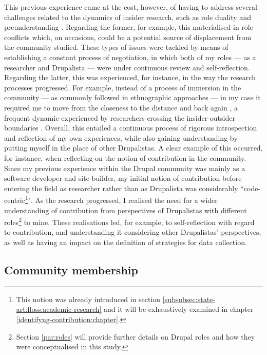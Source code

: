 This previous experience came at the cost, however, of having to address several challenges related to the dynamics of insider research, such as role duality and preunderstanding \parencite[67-71]{brannick2007defense}. Regarding the former, for example, this materialised in role conflicts which, on occasions, could be a potential source of displacement from the community studied. These types of issues were tackled by means of establishing a constant process of negotiation, in which both of my roles --- as a researcher and Drupalista --- were under continuous review and self-reflection. Regarding the latter, this was experienced, for instance, in the way the research processes progressed. For example, instead of a process of immersion in the community --- as commonly followed in ethnographic approaches ---  in my case it required me to move from the closeness to the distance and back again \parencite{nielsen1993nearness}, a frequent dynamic experienced by researchers crossing the insider-outsider boundaries \parencite{kanuha2000being}. Overall, this entailed a continuous process of rigorous introspection and reflection of my own experiences, while also gaining understanding by putting myself in the place of other Drupalistas. A clear example of this occurred, for instance, when reflecting on the notion of contribution in the community. Since my previous experience within the Drupal community was mainly as a software developer and site builder, my initial notion of contribution before entering the field as researcher rather than as Drupalista was considerably ``code-centric\footnote{This notion was already introduced in section \ref{subsubsec:state-art:floss:academic-research} and it will be exhaustively examined in chapter \ref{identifyng-contribution:chapter}.}". As the research progressed, I realised the need for a wider understanding of contribution from perspectives of Drupalistas with different roles\footnote{Section \ref{par:roles} will provide further details on Drupal roles and how they were conceptualised in this study.} to mine. These realisations led, for example, to self-reflection with regard to contribution, and understanding it considering other Drupalistas' perspectives, as well as having an impact on the definition of strategies for data collection.

\subsection{Community membership}
\label{par:who-is-member}

